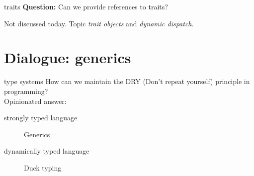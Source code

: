 \documentclass{beamer}
\begin{document}





\begin{frame}[fragile]{traits}
  \textbf{Question:} Can we provide references to traits?

  Not discussed today. Topic \emph{trait objects} and \emph{dynamic dispatch}.

\end{frame}

\section{Dialogue: generics}


\begin{frame}[fragile]{type systems}
  How can we maintain the DRY (Don't repeat yourself) principle in programming? \\[8pt]

  Opinionated answer:
  \begin{description}
    \item[strongly typed language] Generics
    \item[dynamically typed language] Duck typing
  \end{description}
\end{frame}
\end{document}
